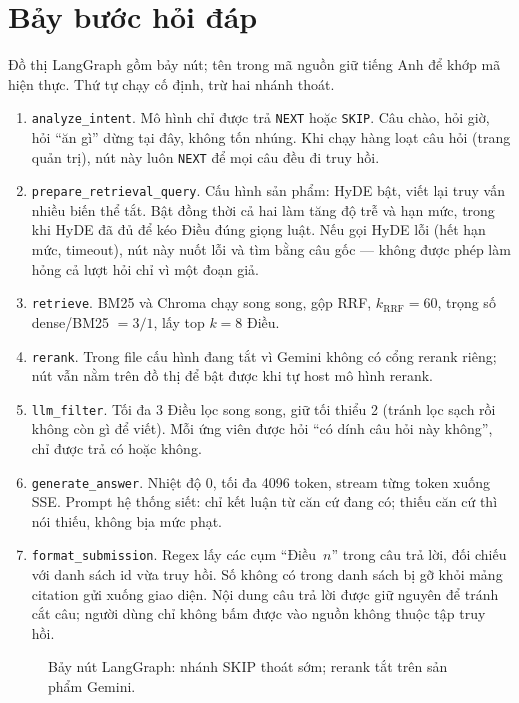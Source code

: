 \section{Bảy bước hỏi đáp}

\label{sec:pipeline}

Đồ thị LangGraph gồm bảy nút; tên trong mã nguồn giữ tiếng Anh để khớp mã hiện
thực. Thứ tự chạy cố định, trừ hai nhánh thoát.

\begin{enumerate}
    \item \texttt{analyze\_intent}. Mô hình chỉ được trả \texttt{NEXT} hoặc
    \texttt{SKIP}. Câu chào, hỏi giờ, hỏi ``ăn gì'' dừng tại đây, không tốn
    nhúng. Khi chạy hàng loạt câu hỏi (trang quản trị), nút này luôn \texttt{NEXT}
    để mọi câu đều đi truy hồi.
    \item \texttt{prepare\_retrieval\_query}. Cấu hình sản phẩm: HyDE bật, viết
    lại truy vấn nhiều biến thể tắt. Bật đồng thời cả hai làm tăng độ trễ và hạn mức, trong khi HyDE đã đủ để kéo Điều đúng giọng luật.
    Nếu gọi HyDE lỗi (hết hạn mức, timeout), nút này nuốt lỗi và tìm bằng câu
    gốc --- không được phép làm hỏng cả lượt hỏi chỉ vì một đoạn giả.
    \item \texttt{retrieve}. BM25 và Chroma chạy song song, gộp RRF,
    $k_{\mathrm{RRF}}=60$, trọng số dense/BM25 $= 3/1$, lấy top $k=8$ Điều.
    \item \texttt{rerank}. Trong file cấu hình đang tắt vì Gemini không có cổng
    rerank riêng; nút vẫn nằm trên đồ thị để bật được khi tự host mô hình rerank.
    \item \texttt{llm\_filter}. Tối đa 3 Điều lọc song song, giữ tối thiểu 2
    (tránh lọc sạch rồi không còn gì để viết). Mỗi ứng viên được hỏi ``có dính
    câu hỏi này không'', chỉ được trả có hoặc không.
    \item \texttt{generate\_answer}. Nhiệt độ 0, tối đa 4096 token, stream từng
    token xuống SSE. Prompt hệ thống siết: chỉ kết luận từ căn cứ đang có; thiếu
    căn cứ thì nói thiếu, không bịa mức phạt.
    \item \texttt{format\_submission}. Regex lấy các cụm ``Điều~$n$'' trong câu
    trả lời, đối chiếu với danh sách id vừa truy hồi. Số không có trong danh sách bị
    gỡ khỏi mảng citation gửi xuống giao diện. Nội dung câu trả lời được giữ nguyên để tránh cắt câu; người dùng chỉ không bấm được vào nguồn không thuộc tập truy hồi.
\end{enumerate}

\begin{figure}[htp]
\centering
\resizebox{0.98\linewidth}{!}{\hinhRag}
\caption{Bảy nút LangGraph: nhánh SKIP thoát sớm; rerank tắt trên sản phẩm Gemini.}
\label{fig:hoat-dong-rag}
\end{figure}

